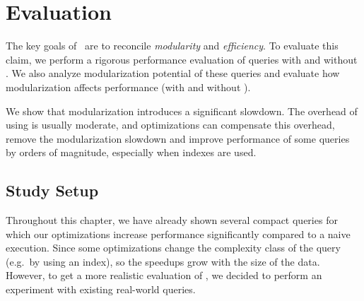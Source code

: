 \newcommand{\graphPath}[1]{aosd13/graphs/#1}

\section{Evaluation}
\label{sec:evaluation}

The key goals of \LoS\ are to reconcile \emph{modularity} and \emph{efficiency}. To evaluate this claim, we perform a rigorous performance evaluation of queries with and without \LoS{}. We also analyze modularization potential of these queries and evaluate how modularization affects performance (with and without \LoS{}).

We show that modularization introduces a significant slowdown. The overhead of
using \LoS{} is usually moderate, and optimizations can compensate this overhead, remove the
modularization slowdown and improve performance of some queries by orders of
magnitude, especially when indexes are used.


\subsection{Study Setup}
Throughout this chapter, we have already shown several compact queries for which our optimizations increase performance significantly compared to a naive execution. Since some optimizations change
the complexity class of the query (e.g.\ by using an index), so the speedups grow with the size of the data. However, to get a more realistic evaluation of \LoS{}, we decided to perform an experiment with existing real-world queries.

